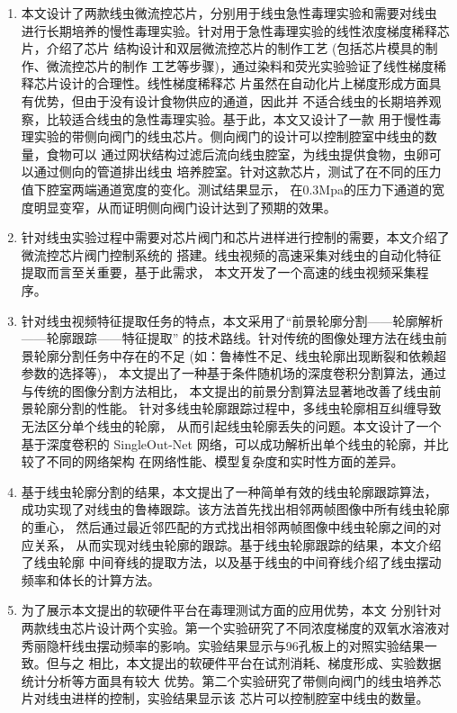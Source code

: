 	\begin{enumerate}[label={(\arabic*)},font={\color{black!50!black}\bfseries}]
	\item 本文设计了两款线虫微流控芯片，分别用于线虫急性毒理实验和需要对线虫
	进行长期培养的慢性毒理实验。针对用于急性毒理实验的线性浓度梯度稀释芯片，介绍了芯片
	结构设计和双层微流控芯片的制作工艺 (包括芯片模具的制作、微流控芯片的制作
	工艺等步骤)，通过染料和荧光实验验证了线性梯度稀释芯片设计的合理性。线性梯度稀释芯
	片虽然在自动化片上梯度形成方面具有优势，但由于没有设计食物供应的通道，因此并
	不适合线虫的长期培养观察，比较适合线虫的急性毒理实验。基于此，本文又设计了一款
	用于慢性毒理实验的带侧向阀门的线虫芯片。侧向阀门的设计可以控制腔室中线虫的数量，食物可以
	通过网状结构过滤后流向线虫腔室，为线虫提供食物，虫卵可以通过侧向的管道排出线虫
	培养腔室。针对这款芯片，测试了在不同的压力值下腔室两端通道宽度的变化。测试结果显示，
	在0.3Mpa的压力下通道的宽度明显变窄，从而证明侧向阀门设计达到了预期的效果。
	\item 针对线虫实验过程中需要对芯片阀门和芯片进样进行控制的需要，本文介绍了微流控芯片阀门控制系统的
	搭建。线虫视频的高速采集对线虫的自动化特征提取而言至关重要，基于此需求，
	本文开发了一个高速的线虫视频采集程序。

	\item 针对线虫视频特征提取任务的特点，本文采用了“前景轮廓分割——轮廓解析——轮廓跟踪——特征提取”
	的技术路线。针对传统的图像处理方法在线虫前景轮廓分割任务中存在的不足 
	(如：鲁棒性不足、线虫轮廓出现断裂和依赖超参数的选择等)，
	本文提出了一种基于条件随机场的深度卷积分割算法，通过与传统的图像分割方法相比，
	本文提出的前景分割算法显著地改善了线虫前景轮廓分割的性能。
	针对多线虫轮廓跟踪过程中，多线虫轮廓相互纠缠导致无法区分单个线虫的轮廓，
	从而引起线虫轮廓丢失的问题。本文设计了一个基于深度卷积的 
	SingleOut-Net 网络，可以成功解析出单个线虫的轮廓，并比较了不同的网络架构
	在网络性能、模型复杂度和实时性方面的差异。

	\item 基于线虫轮廓分割的结果，本文提出了一种简单有效的线虫轮廓跟踪算法，
	成功实现了对线虫的鲁棒跟踪。该方法首先找出相邻两帧图像中所有线虫轮廓的重心，
	然后通过最近邻匹配的方式找出相邻两帧图像中线虫轮廓之间的对应关系，
	从而实现对线虫轮廓的跟踪。基于线虫轮廓跟踪的结果，本文介绍了线虫轮廓
	中间脊线的提取方法，以及基于线虫的中间脊线介绍了线虫摆动频率和体长的计算方法。
	
	\item 为了展示本文提出的软硬件平台在毒理测试方面的应用优势，本文
	分别针对两款线虫芯片设计两个实验。第一个实验研究了不同浓度梯度的双氧水溶液对
	秀丽隐杆线虫摆动频率的影响。实验结果显示与96孔板上的对照实验结果一致。但与之
	相比，本文提出的软硬件平台在试剂消耗、梯度形成、实验数据统计分析等方面具有较大
	优势。第二个实验研究了带侧向阀门的线虫培养芯片对线虫进样的控制，实验结果显示该
	芯片可以控制腔室中线虫的数量。
	\end{enumerate}
	
